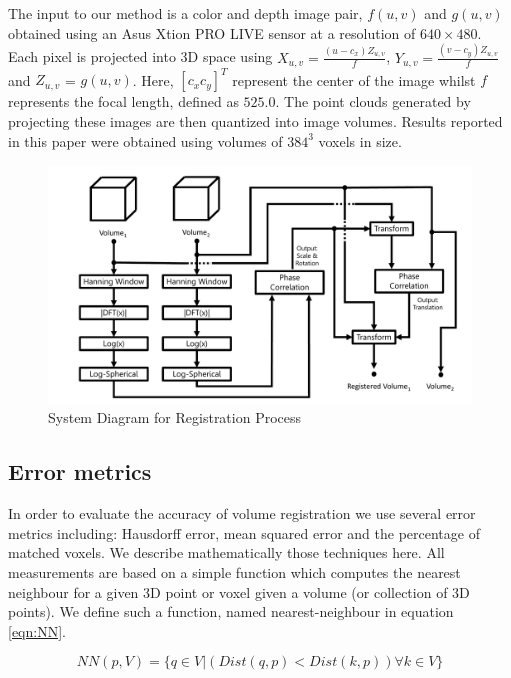 The input to our method is a color and depth image pair, $f(u,v)$ and $g(u,v)$ obtained using an Asus Xtion PRO LIVE sensor at a resolution of $640 \times 480$. Each pixel is projected into 3D space using $X_{u,v} = \frac{(u - c_x)Z_{u,v}}{f}$, $Y_{u,v} = \frac{(v - c_y)Z_{u,v}}{f}$ and $Z_{u,v}$ = $g(u,v)$. 
Here, $[c_x c_y]^T$ represent the center of the image whilst $f$ represents the focal length, defined as $525.0$. The point clouds generated by projecting these images are then quantized into image volumes. Results reported in this paper were obtained using volumes of $384^3$ voxels in size.

\begin{figure}[t]
\centering
\includegraphics[width=6.0in]{images/ch2/pipeline2}
\caption{System Diagram for Registration Process}
\label{fig:PIPELINE}
\end{figure}


\subsection{Error metrics}

In order to evaluate the accuracy of volume registration we use several error metrics including: Hausdorff error, mean squared error and the percentage of matched voxels. We describe mathematically those techniques here. All measurements are based on a simple function which computes the nearest neighbour for a given 3D point or voxel given a volume (or collection of 3D points). We define such a function, named nearest-neighbour in equation \ref{eqn:NN}.

\begin{equation} \label{eqn:NN}
NN(p, V) =  \{ q \in V | (Dist(q, p) < Dist(k, p))  \forall k \in V \}
\end{equation}

